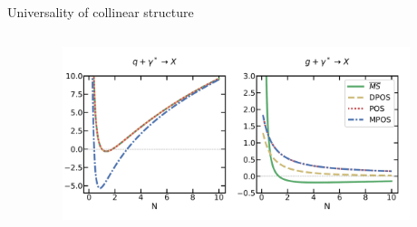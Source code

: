 \documentclass[8pt]{beamer}
\begin{document}
\begin{frame}{Universality of collinear structure}
\begin{columns}
\begin{column}{0.4\textwidth}
        \end{column}
        \begin{column}{0.6\textwidth}
            \begin{figure}
              \includegraphics[width=0.95\textwidth]{pictures/dis}
            \end{figure}
        \end{column}
    \end{columns}
\end{frame}
\end{document}
